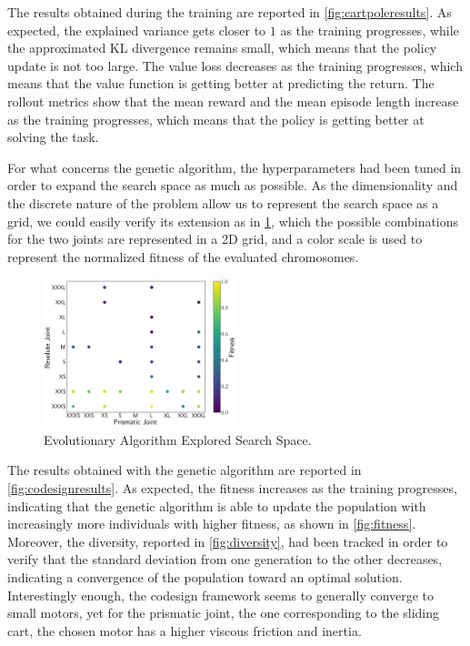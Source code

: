 The results obtained during the training are reported in \cref{fig:cartpoleresults}. As expected, the explained variance gets closer to $1$ as the training progresses, while the approximated KL divergence remains small, which means that the policy update is not too large. The value loss decreases as the training progresses, which means that the value function is getting better at predicting the return. The rollout metrics show that the mean reward and the mean episode length increase as the training progresses, which means that the policy is getting better at solving the task.

For what concerns the genetic algorithm, the hyperparameters had been tuned in order to expand the search space as much as possible. As the dimensionality and the discrete nature of the problem allow us to represent the search space as a grid, we could easily verify its extension as in \cref{fig:searchspace}, which the possible combinations for the two joints are represented in a 2D grid, and a color scale is used to represent the normalized fitness of the evaluated chromosomes.

\begin{figure}
    \centering
    \caption{Evolutionary Algorithm Explored Search Space.}
    \label{fig:searchspace}
    \includegraphics[width=0.5\textwidth]{Images/search_space.png}
\end{figure}

The results obtained with the genetic algorithm are reported in \cref{fig:codesignresults}. As expected, the fitness increases as the training progresses, indicating that the genetic algorithm is able to update the population with increasingly more individuals with higher fitness, as shown in \cref{fig:fitness}. Moreover, the diversity, reported in \cref{fig:diversity}, had been tracked in order to verify that the standard deviation from one generation to the other decreases, indicating a convergence of the population toward an optimal solution. Interestingly enough, the codesign framework seems to generally converge to small motors, yet for the prismatic joint, the one corresponding to the sliding cart, the chosen motor has a higher viscous friction and inertia.

